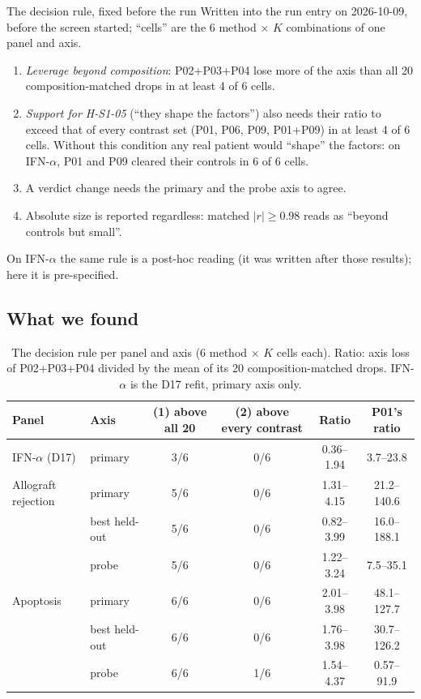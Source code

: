 \begin{explainbox}{The decision rule, fixed before the run}
Written into the run entry on 2026-10-09, before the screen started; ``cells'' are the 6 method $\times$ $K$ combinations of one panel and axis.
\begin{enumerate}[label=(\arabic*),leftmargin=1.6em]
\item \emph{Leverage beyond composition}: P02+P03+P04 lose more of the axis than all 20 composition-matched drops in at least 4 of 6 cells.
\item \emph{Support for H-S1-05} (``they shape the factors'') also needs their ratio to exceed that of every contrast set (P01, P06, P09, P01+P09) in at least 4 of 6 cells. Without this condition any real patient would ``shape'' the factors: on IFN-$\alpha$, P01 and P09 cleared their controls in 6 of 6 cells.
\item A verdict change needs the primary and the probe axis to agree.
\item Absolute size is reported regardless: matched $|r| \geq 0.98$ reads as ``beyond controls but small''.
\end{enumerate}
On IFN-$\alpha$ the same rule is a post-hoc reading (it was written after those results); here it is pre-specified.
\end{explainbox}

\subsection*{What we found}

\begin{table}[H]
\centering
\small
\caption{The decision rule per panel and axis (6 method $\times$ $K$ cells each). Ratio: axis loss of P02+P03+P04 divided by the mean of its 20 composition-matched drops. IFN-$\alpha$ is the D17 refit, primary axis only.}
\label{tab:d26rule}
\setlength{\tabcolsep}{4.5pt}
\begin{tabular}{l l c c c c}
\toprule
Panel & Axis & (1) above all 20 & (2) above every contrast & Ratio & P01's ratio \\
\midrule
IFN-$\alpha$ (D17) & primary & 3/6 & 0/6 & 0.36--1.94 & 3.7--23.8 \\
\addlinespace
Allograft rejection & primary & 5/6 & 0/6 & 1.31--4.15 & 21.2--140.6 \\
 & best held-out & 5/6 & 0/6 & 0.82--3.99 & 16.0--188.1 \\
 & probe & 5/6 & 0/6 & 1.22--3.24 & 7.5--35.1 \\
\addlinespace
Apoptosis & primary & 6/6 & 0/6 & 2.01--3.98 & 48.1--127.7 \\
 & best held-out & 6/6 & 0/6 & 1.76--3.98 & 30.7--126.2 \\
 & probe & 6/6 & 1/6 & 1.54--4.37 & 0.57--91.9 \\
\bottomrule
\end{tabular}
\end{table}


